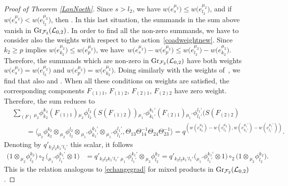 \documentclass[10pt,a4paper]{amsart}
\numberwithin{equation}{section}
\theoremstyle{definition}
\newcommand{\Ll}{{\mathcal L}}
\begin{document}
\begin{proof}[Proof of Theorem \ref{LonNoeth}]
Since $s>l_2$, we have $w\big(e_{s}^{\mu_2}\big)\leq w\big(e_{l_2}^{\mu_2}\big)$, and if $w\big(e_{s}^{\mu_2}\big) < w\big(e_{l_2}^{\mu_2}\big)$, then . In this last situation, the summands  in the sum above vanish in ${\rm Gr}_{\mathcal{F}_3}(\Ll_{0,2})$. In order to find all the non-zero summands, we have to consider also the weights with respect to the action~\eqref{coadweightnew}. Since $k_2\geq p$ implies $w\big(e_{k_2}^{\mu_2}\big)\leq w\big(e_{p}^{\mu_2}\big)$, we have~${w\big(e_{s}^{\mu_2}\big)-w\big(e_{p}^{\mu_2}\big) \leq w\big(e_{l_2}^{\mu_2}\big)-w\big(e_{k_2}^{\mu_2}\big)}$. Therefore, the summands which are non-zero in ${{\rm Gr}_{\mathcal{F}_3}(\Ll_{0,2})}$ have both weights $w\big(e_{s}^{\mu_2}\big) = w\big(e_{l_2}^{\mu_2}\big)$ and $w\big(e_{p}^{\mu_2}\big) = w\big(e_{k_2}^{\mu_2}\big)$. Doing similarly with the weights of~, we find that also  and . When all these conditions on weights are satisfied, the corresponding components $F_{(1)1}$, $F_{(1)2}$, $F_{(2)1}$, $F_{(2)2}$ have zero weight. Therefore, the sum reduces to
\begin{align*}
&\sum_{(F)} {}_{{\mu_2}}\phi_{k_2}^{k_2}(F_{(1)1}){}_{{\mu_2}}\phi_{l_2}^{l_2}(S(F_{(1)2})){}_{{\mu_1'}}\phi_{k_1'}^{k_1'}(F_{(2)1}){}_{{\mu_1'}}\phi_{l_1'}^{l_1'}(S(F_{(2)2}) \\ & \qquad =\big\langle {}_{{\mu_2}}\phi_{k_2}^{k_2}\otimes {}_{{\mu_2}}\phi_{l_2}^{l_2}\otimes {}_{{\mu_1'}}\phi_{k_1'}^{k_1'}\otimes {}_{{\mu_1'}}\phi_{l_1'}^{l_1'}, \Theta_{13}\Theta_{14}^{-1}\Theta_{24}\Theta_{23}^{-1}\big\rangle = q^{(w(e_{k_2}^{\mu_2})-w(e_{l_2}^{\mu_2}), w(e_{k_1'}^{\mu_1'}) - w(e_{l_1'}^{\mu_1'}) )}.
\end{align*}
Denoting by $q'_{k_2l_2k_1'l_1'}$ this scalar, it follows
\begin{align*}
\big(1 \otimes {}_{{\mu_2}}\phi^{k_2}_{l_2}\big) \circ_2 \big({}_{{\mu_1'}}\phi^{k_1'}_{l_1'} \otimes 1\big) & = q'_{k_2l_2k_1'l_1'} \ {}_{{\mu_1'}}\phi^{k_1'}_{l_1'} \otimes {}_{{\mu_2}}\phi^{k_2}_{l_2} = q'_{k_2l_2k_1'l_1'} \big({}_{{\mu_1'}}\phi^{k_1'}_{l_1'} \otimes 1\big)\circ_2 \big(1 \otimes {}_{{\mu_2}}\phi^{k_2}_{l_2}\big).
\end{align*}
This is the relation analogous to \eqref{echangegrad} for mixed products in ${\rm Gr}_{\mathcal{F}_3}(\Ll_{0,2})$.


\end{proof}
\end{document}
